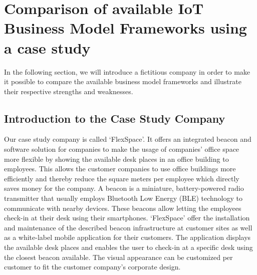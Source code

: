 \section{Comparison of available IoT Business Model Frameworks using a case study}
\label{sec:bmf_comparison}
	In the following section, we will introduce a fictitious company in order to make it possible to compare the available business model frameworks and illustrate their respective strengths and weaknesses.

	\subsection{Introduction to the Case Study Company}
		Our case study company is called `FlexSpace'. It offers an integrated beacon and software solution for companies to make the usage of companies' office space more flexible by showing the available desk places in an office building to employees. This allows the customer companies to use office buildings more efficiently and thereby reduce the square meters per employee which directly saves money for the company. A beacon is a miniature, battery-powered radio transmitter that usually employs  Bluetooth Low Energy (BLE) technology to communicate with nearby devices. These beacons allow letting the employees check-in at their desk using their smartphones. `FlexSpace' offer the installation and maintenance of the described beacon infrastructure at customer sites as well as a white-label mobile application for their customers. The application displays the available desk places and enables the user to check-in at a specific desk using the closest beacon available. The visual appearance can be customized per customer to fit the customer company's corporate design.


